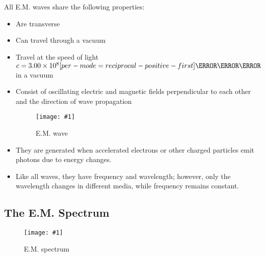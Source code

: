\documentclass[a4paper,12pt]{article}
\let\oldsi\si
\renewcommand{\si}[1]{\oldsi[per-mode=reciprocal-positive-first]{#1}}
\newcommand{\img}[4]{\begin{center}
  \begin{figure}[H]
    \centering
    \texttt{[image: \#1]}
    \caption{#3}
    \label{fig:#4}
  \end{figure}
\end{center}}
\begin{document}
All E.M. waves share the following properties:
\begin{itemize}
  \item Are transverse
  \item Can travel through a vacuum
  \item Travel at the speed of light $c = 3.00 \times 10^8 \si{\meter\per\second}$ in a vacuum
  \item Consist of oscillating electric and magnetic fields perpendicular to each other and the direction of wave propagation
        \img{em.png}{0.6}{E.M. wave}{em}
  \item They are generated when accelerated electrons or other charged particles emit photons due to energy changes.
  \item Like all waves, they have frequency and wavelength; however, only the wavelength changes in different media, while frequency remains constant.
\end{itemize}

\pagebreak

\subsection{The E.M. Spectrum}

\img{emspectrum.jpg}{0.9}{E.M. spectrum}{emspectrum}
\end{document}
